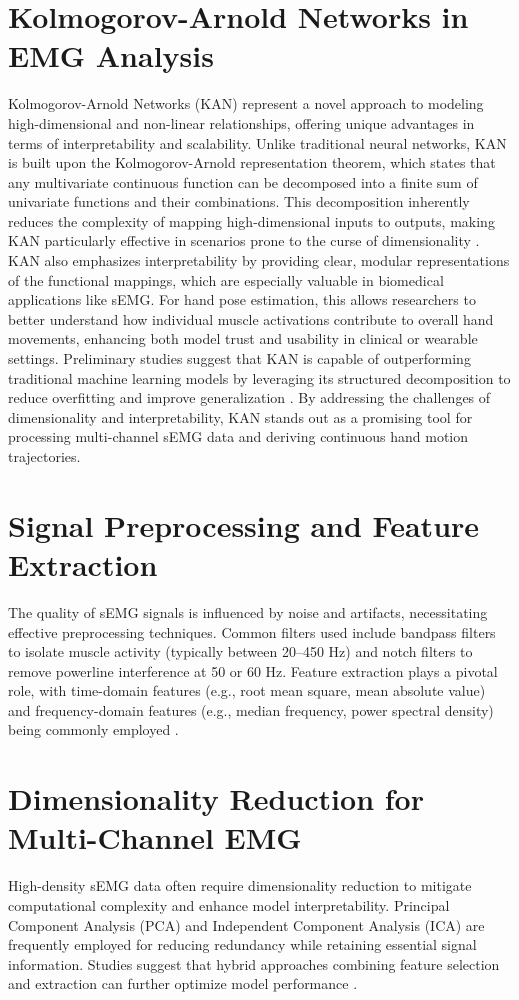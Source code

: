 \section{Kolmogorov-Arnold Networks in EMG Analysis}
Kolmogorov-Arnold Networks (KAN) represent a novel approach to modeling high-dimensional and non-linear relationships, offering unique advantages in terms of interpretability and scalability. Unlike traditional neural networks, KAN is built upon the Kolmogorov-Arnold representation theorem, which states that any multivariate continuous function can be decomposed into a finite sum of univariate functions and their combinations. This decomposition inherently reduces the complexity of mapping high-dimensional inputs to outputs, making KAN particularly effective in scenarios prone to the curse of dimensionality \cite{chen2022kanemg}.
KAN also emphasizes interpretability by providing clear, modular representations of the functional mappings, which are especially valuable in biomedical applications like sEMG. For hand pose estimation, this allows researchers to better understand how individual muscle activations contribute to overall hand movements, enhancing both model trust and usability in clinical or wearable settings. Preliminary studies suggest that KAN is capable of outperforming traditional machine learning models by leveraging its structured decomposition to reduce overfitting and improve generalization \cite{chen2022kanemg}.
By addressing the challenges of dimensionality and interpretability, KAN stands out as a promising tool for processing multi-channel sEMG data and deriving continuous hand motion trajectories.

\section{Signal Preprocessing and Feature Extraction}
The quality of sEMG signals is influenced by noise and artifacts, necessitating effective preprocessing techniques. Common filters used include bandpass filters to isolate muscle activity (typically between 20–450 Hz) and notch filters to remove powerline interference at 50 or 60 Hz. Feature extraction plays a pivotal role, with time-domain features (e.g., root mean square, mean absolute value) and frequency-domain features (e.g., median frequency, power spectral density) being commonly employed \cite{farina2004biomedical}.

\section{Dimensionality Reduction for Multi-Channel EMG}
High-density sEMG data often require dimensionality reduction to mitigate computational complexity and enhance model interpretability. Principal Component Analysis (PCA) and Independent Component Analysis (ICA) are frequently employed for reducing redundancy while retaining essential signal information. Studies suggest that hybrid approaches combining feature selection and extraction can further optimize model performance \cite{englehart2003robust}.


